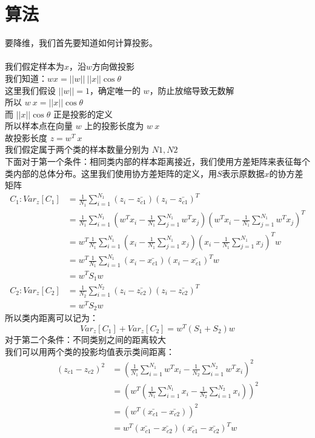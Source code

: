 \documentclass{report}
\begin{document}
\section{算法}
要降维，我们首先要知道如何计算投影。\\\\
我们假定样本为$x$，沿$w$方向做投影\\
我们知道：$w x=||w||\ ||x|| \cos{\theta}$\\
这里我们假设 $||w||=1$，确定唯一的 $w$，防止放缩导致无数解\\
所以 $w\ x=||x||\cos{\theta}$\\
而 $||x||\cos{\theta}$ 正是投影的定义\\
所以样本点在向量 $w$ 上的投影长度为 $w\ x$\\
故投影长度 $z=w^T\ x$\\
我们假定属于两个类的样本数量分别为 $N1,N2$\\
下面对于第一个条件：相同类内部的样本距离接近，我们使用方差矩阵来表征每个类内部的总体分布。这里我们使用协方差矩阵的定义，用$S$表示原数据$x$的协方差矩阵
\begin{equation}
\begin{aligned}C_1: Var_z[C_1]&=\frac{1}{N_1}\sum_{i=1}^{N_1} (z_i-\bar{z_{c1}})(z_i-\bar{z_{c1}})^T\\
&=\frac{1}{N_1}\sum_{i=1}^{N_1}(w^T x_i-\frac{1}{N_1}\sum_{j=1}^{N_1}w^T x_j)(w^T x_i-\frac{1}{N_1}\sum_{j=1}^{N_1}w^T x_j)^T \\&=w^T \frac{1}{N_1}\sum_{i=1}^{N_1}(x_i-\frac{1}{N_1}\sum_{j=1}^{N_1} x_j)(x_i-\frac{1}{N_1}\sum_{j=1}^{N_1} x_j)^T w\\&=w^{T} \frac{1}{N_{1}} \sum_{i=1}^{N_{1}}\left(x_{i}-\bar{x_{c 1}}\right)\left(x_{i}-\bar{x_{c 1}}\right)^{T} w\\&=w^T S_1 w\\C_2: Var_z[C_2]&=\frac{1}{N_2}\sum_{i=1}^{N_2} (z_i-\bar{z_{c2}})(z_i-\bar{z_{c2}})^T\\&=w^T S_2 w
\end{aligned}
\end{equation}
所以类内距离可以记为：
$$
Var_z[C_1]+Var_z[C_2]=w^T(S_1+S_2)w
$$
对于第二个条件：不同类别之间的距离较大\\
我们可以用两个类的投影均值表示类间距离：
\begin{equation}
\begin{aligned}
(z_{c1}-z_{c2})^2&=(\frac{1}{N_1}\sum_{i=1}^{N_1}w^T x_i - \frac{1}{N_2}\sum_{i=1}^{N_2}w^T x_i)^2\\
&=(w^T(\frac{1}{N_1}\sum_{i=1}^{N_1} x_i - \frac{1}{N_2}\sum_{i=1}^{N_2} x_i))^2\\
&=(w^T(\bar{x_{c1}}-\bar{x_{c2}}))^2\\
&=w^T(\bar{x_{c1}}-\bar{x_{c2}})(\bar{x_{c1}}-\bar{x_{c2}})^T w
\end{aligned}
\end{equation}
\end{document}
